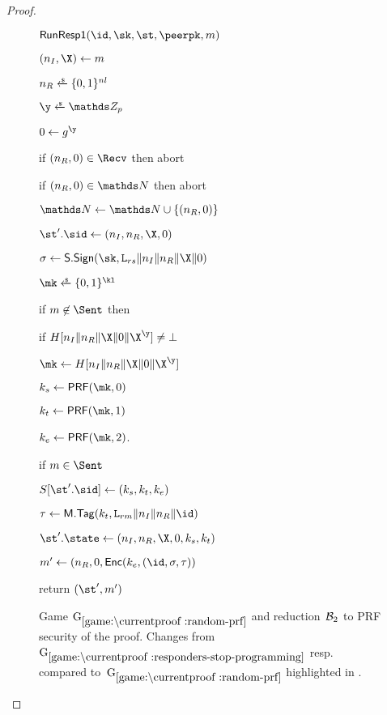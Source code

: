 \begin{proof}
\begin{collectinmacro}{\SIGMIProofPRF}{}{}
\begin{figure}[t]
\begin{minipage}[t]{0.49\textwidth}
      \begin{oracle}{$\RunRespI(\id,\sk,\st,\peerpk,m)$}
        \item $(\nonce_I,\X) \gets m$
        \item $\nonce_R \sample \bits^{\nl}$
        \item $\y \sample \ZZ_p$
        \item $\Y \gets g^{\y}$
        \item if $(\nonce_R, \Y) \in \Recv$ then abort
        \item if $(\nonce_R, \Y) \in \N$ then abort
        \item $\N \gets \N \cup \{(\nonce_R,\Y)\}$
        \item $\st'.\sid \gets (\nonce_I, \nonce_R,\X,\Y)$
        \item $\sigma \gets \SIGScheme.\SIGSign(\sk,\labelrs\|\nonce_I\|\nonce_R\|\X\|\Y)$
        \item $\mk\sample \bits^{\kl}$
        \item if $m \not\in \Sent$ then
        \item \hindent if $H[\nonce_I\|\nonce_R\|\X\|\Y\|\X^{\y}]\neq \bot$
        \item \hindent \hindent$\mk \gets H[\nonce_I\|\nonce_R\|\X\|\Y\|\X^{\y}]$
        \item $\ks \gets \PRF(\mk,0)$
        \item $\kt \gets \PRF(\mk,1)$
        \item $\ke \gets \PRF(\mk,2)$. 
        \item if $m \in \Sent$
        \item \hindent {}
        \item \hindent {}
        \item \hindent {}
        \item \hindent {}
        \item \hindent $\S[\st'.\sid] \gets (\ks,\kt,\ke)$
        \item $\tau \gets \MACScheme.\MACTag(\kt, \labelrm\|\nonce_I\|\nonce_R\|\id)$
        \item $\st'.\state \gets (\nonce_I,\nonce_R,\X,\Y,\ks,\kt)$
        \item $m' \gets (\nonce_R, \Y,  \ENCEnc(\ke,(\id, \sigma, \tau))$
        \item return $(\st', m')$
        \end{oracle}
    \end{minipage}
  	\caption[]{%
		Game $\lblGm{random-prf}$ and reduction~$\mathcal{B}_2$ to PRF security of the \SIGMAI proof.
		Changes from~$\lblGm{responders-stop-programming}$ resp. compared to~$\lblGm{random-prf}$ highlighted in .
  	}
  	\label{fig:SIGMAI-proof:game:random-prf}
  	\label{fig:SIGMAI-proof:game:advB2}
  	

\end{figure}
\end{collectinmacro}
\end{proof}
